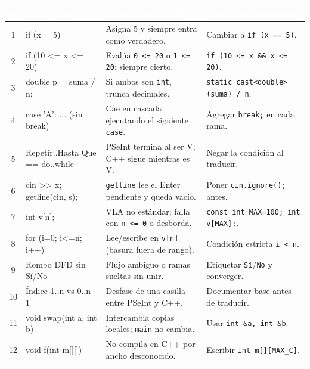 \documentclass[11pt,letterpaper]{article}
\begin{document}
\begin{center}
  \footnotesize
  \begin{tabularx}{\textwidth}{c >{\ttfamily\raggedright\arraybackslash}p{3.6cm} >{\raggedright\arraybackslash}X >{\raggedright\arraybackslash}p{4.6cm}}
    \rowcolor{RojoAlerta}
    \textcolor{white}{\textbf{\#}} & \textcolor{white}{\textbf{\sffamily Error típico}} & \textcolor{white}{\textbf{Consecuencia real}} & \textcolor{white}{\textbf{Corrección inmediata}} \\
    \midrule
    1 & if (x = 5) & Asigna 5 y siempre entra como verdadero. & Cambiar a \texttt{if (x == 5)}. \\
    2 & if (10 <= x <= 20) & Evalúa \texttt{0 <= 20} o \texttt{1 <= 20}: siempre cierto. & \texttt{if (10 <= x \&\& x <= 20)}. \\
    3 & double p = suma / n; & Si ambos son \texttt{int}, trunca decimales. & \texttt{static\_cast<double>(suma) / n}. \\
    4 & case 'A': ... (sin break) & Cae en cascada ejecutando el siguiente \texttt{case}. & Agregar \texttt{break;} en cada rama. \\
    5 & Repetir..Hasta Que == do..while & PSeInt termina al ser V; C++ sigue mientras es V. & Negar la condición al traducir. \\
    6 & cin >> x; getline(cin, s); & \texttt{getline} lee el Enter pendiente y queda vacío. & Poner \texttt{cin.ignore();} antes. \\
    7 & int v[n]; & VLA no estándar; falla con \texttt{n <= 0} o desborda. & \texttt{const int MAX=100; int v[MAX];}. \\
    8 & for (i=0; i<=n; i++) & Lee/escribe en \texttt{v[n]} (basura fuera de rango). & Condición estricta \texttt{i < n}. \\
    9 & Rombo DFD sin Sí/No & Flujo ambiguo o ramas sueltas sin unir. & Etiquetar \texttt{Sí}/\texttt{No} y converger. \\
    10 & Índice 1..n vs 0..n-1 & Desfase de una casilla entre PSeInt y C++. & Documentar base antes de traducir. \\
    11 & void swap(int a, int b) & Intercambia copias locales; \texttt{main} no cambia. & Usar \texttt{int \&a, int \&b}. \\
    12 & void f(int m[][]) & No compila en C++ por ancho desconocido. & Escribir \texttt{int m[][MAX\_C]}. \\
    \bottomrule
  \end{tabularx}
\end{center}
\end{document}
